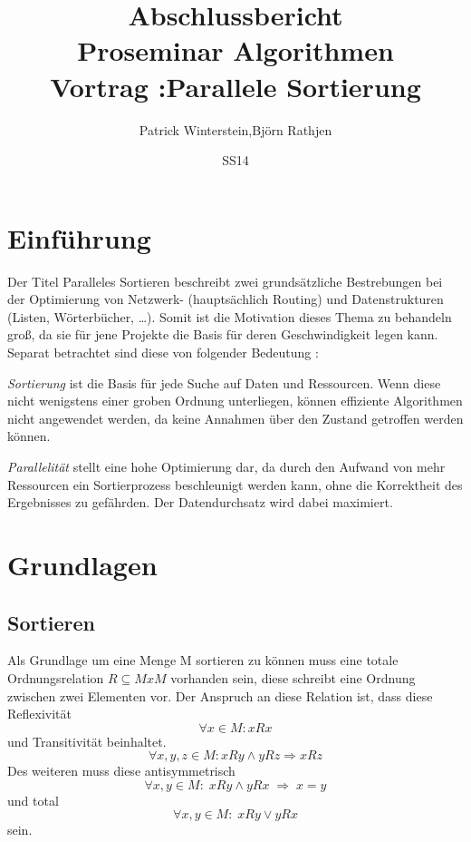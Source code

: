 \documentclass[11pt,ngerman]{article}
\title{Abschlussbericht\\Proseminar Algorithmen\\Vortrag :Parallele Sortierung}
\author{Patrick Winterstein,Björn Rathjen}
\date{SS14}
\begin{document}
\maketitle
\newpage
\tableofcontents
\newpage
\listoffigures
\listoftables
\section{Einführung}
Der Titel Paralleles Sortieren beschreibt zwei grundsätzliche Bestrebungen bei der Optimierung von Netzwerk- (hauptsächlich Routing) und Datenstrukturen (Listen, Wörterbücher, \dots). Somit ist die Motivation dieses Thema zu behandeln groß, da sie für jene Projekte die Basis für deren Geschwindigkeit legen kann. Separat betrachtet sind diese von folgender Bedeutung :

\emph{Sortierung} ist die Basis für jede Suche auf Daten und Ressourcen. Wenn diese nicht wenigstens einer groben Ordnung unterliegen, können effiziente Algorithmen nicht angewendet werden, da keine Annahmen über den Zustand getroffen werden können.

\emph{Parallelität} stellt eine hohe Optimierung dar, da durch den Aufwand von mehr Ressourcen ein Sortierprozess beschleunigt werden kann, ohne die Korrektheit des Ergebnisses zu gefährden. Der Datendurchsatz wird dabei maximiert.

\section{Grundlagen}

\subsection{Sortieren}
Als Grundlage um eine Menge M sortieren zu können muss eine totale Ordnungsrelation $R \subseteq MxM$ vorhanden sein, diese schreibt eine Ordnung zwischen zwei Elementen vor. 
Der Anspruch an diese Relation ist, dass diese Reflexivität 
\begin{equation}
\forall x \in M : x R x
\label{eq:reflex}
\end{equation}
und Transitivität beinhaltet.
\begin{equation}
\forall x,y,z \in M : xRy \wedge yRz \Rightarrow xRz
\label{eq:transit}
\end{equation}
Des weiteren muss diese antisymmetrisch 
\begin{equation}
\forall x,y \in M :\; xRy \wedge yRx \; \Rightarrow \; x = y
\label{eq:antisym}
\end{equation}
und total 
\begin{equation}
\forall x,y \in M : \; xRy \vee yRx
\label{eq:total}
\end{equation}
sein.
\FloatBarrier
\end{document}
